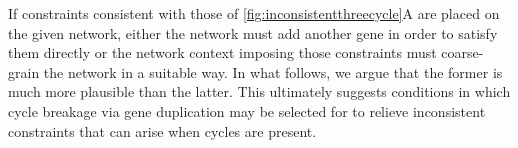 If constraints consistent with those of \ref{fig:inconsistentthreecycle}A are placed on the given network, either the network must add another gene in order to satisfy them directly or the network context imposing those constraints must coarse-grain the network in a suitable way. In what follows, we argue that the former is much more plausible than the latter. This ultimately suggests conditions in which cycle breakage via gene duplication may be selected for to relieve inconsistent constraints that can arise when cycles are present.
